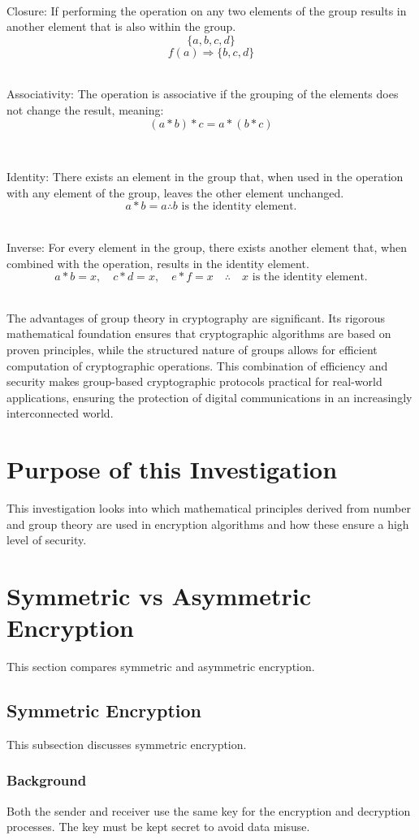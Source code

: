 \documentclass[11pt]{article}
\begin{document}
\

Closure: If performing the operation on any two elements of the group results in another element that is also within the group.
\[
\{a, b, c, d\}
\]
\[
f(a) \Rightarrow \{b, c, d\}
\]
\

Associativity: The operation is associative if the grouping of the elements does not change the result, meaning: 
\[
(a \ast b) \ast c = a \ast (b \ast c)
\]

\

Identity: There exists an element in the group that, when used in the operation with any element of the group, leaves the other element unchanged.
\[
a * b = a \therefore b \text{ is the identity element.}
\]
\

Inverse: For every element in the group, there exists another element that, when combined with the operation, results in the identity element.
\[
a * b = x, \quad c * d = x, \quad e * f = x \quad \therefore \quad x \text{ is the identity element.}
\]
\

The advantages of group theory in cryptography are significant. Its rigorous mathematical foundation ensures that cryptographic algorithms are based on proven principles, while the structured nature of groups allows for efficient computation of cryptographic operations. This combination of efficiency and security makes group-based cryptographic protocols practical for real-world applications, ensuring the protection of digital communications in an increasingly interconnected world.


\section{Purpose of this Investigation}
This investigation looks into which mathematical principles derived from number and group theory are used in encryption algorithms and how these ensure a high level of security.

\section{Symmetric vs Asymmetric Encryption}
This section compares symmetric and asymmetric encryption.

\subsection{Symmetric Encryption}
This subsection discusses symmetric encryption.

\subsubsection{Background}
Both the sender and receiver use the same key for the encryption and decryption processes. The key must be kept secret to avoid data misuse. 
\end{document}
